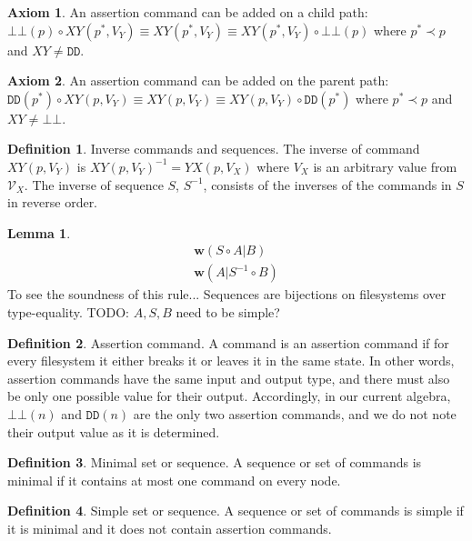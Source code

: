 \documentclass[12pt]{article}
\newcommand{\setvx}[1]{\mathcal{V}_{#1}}
\newcommand{\empt}{\bot}
\newcommand{\pp}{p^*} %
\newcommand{\fscommand}[2]{{#1#2}}
\newcommand{\fsregcommandchar}[1]{\mathtt{#1}}
\newcommand{\fsregcommand}[2]{\fscommand{\fsregcommandchar{#1}}{\fsregcommandchar{#2}}}
\newcommand{\cbb}{\fsregcommand{\empt}{\empt}}
\newcommand{\cdd}{\fsregcommand{D}{D}}
\newcommand{\cxy}{\fscommand{X}{Y}}
\newcommand{\cyx}{\fscommand{Y}{X}}
\newcommand{\cc}{\circ} %
\newcommand{\descendant}{\prec}
\newcommand{\worksc}[2]{{\mathbf{w}}({#1}|{#2})}
\newcommand{\infer}[2]{\begin{array}{c}{#1}\\\hline{#2}\end{array}}
\theoremstyle{definition}
\newtheorem{mydef}{Definition}
\newtheorem{myax}{Axiom}
\newtheorem{mylem}{Lemma}
\begin{document}
\begin{myax}\label{ax_child_assert}
An assertion command can be added on a child path:
$\cbb(p)\cc \cxy(\pp,V_Y) \equiv \cxy(\pp,V_Y) \equiv \cxy(\pp,V_Y)\cc \cbb(p)$ where $\pp\descendant p$ and $\cxy\neq\cdd$.
\end{myax}

\begin{myax}\label{ax_parent_assert}
An assertion command can be added on the parent path:
$\cdd(\pp)\cc \cxy(p,V_Y) \equiv \cxy(p,V_Y) \equiv \cxy(p,V_Y)\cc \cdd(\pp)$ where $\pp\descendant p$ and $\cxy\neq\cbb$.
\end{myax}










\begin{mydef}{Inverse commands and sequences.}
The inverse of command $\cxy(p,V_Y)$ is $\cxy(p,V_Y)^{-1} = \cyx(p,V_X)$
where $V_X$ is an arbitrary value from $\setvx{X}$.
The inverse of sequence $S$, $S^{-1}$, consists of the inverses of the commands in $S$
in reverse order.
\end{mydef}

\begin{mylem}\label{r_invmove}
\[ \infer{\worksc{S\cc A}{B}}{\worksc{A}{S^{-1}\cc B}} \]
To see the soundness of this rule...
Sequences are bijections on filesystems over type-equality.
TODO: $A,S,B$ need to be simple?
\end{mylem}

\begin{mydef}{Assertion command.}
A command is an assertion command if
for every filesystem it either breaks it or leaves it in the same state.
In other words, assertion commands have the same input and output type,
and there must also be only one possible value for their output.
Accordingly, in our current algebra, $\cbb(n)$ and $\cdd(n)$ are the only two assertion commands,
and we do not note their output value as it is determined.
\end{mydef}

\begin{mydef}{Minimal set or sequence.}
A sequence or set of commands is minimal if it contains at most one command on every node.
\end{mydef}

\begin{mydef}{Simple set or sequence.}
A sequence or set of commands is simple if it is minimal and it does not contain assertion commands.
\end{mydef}
\end{document}
